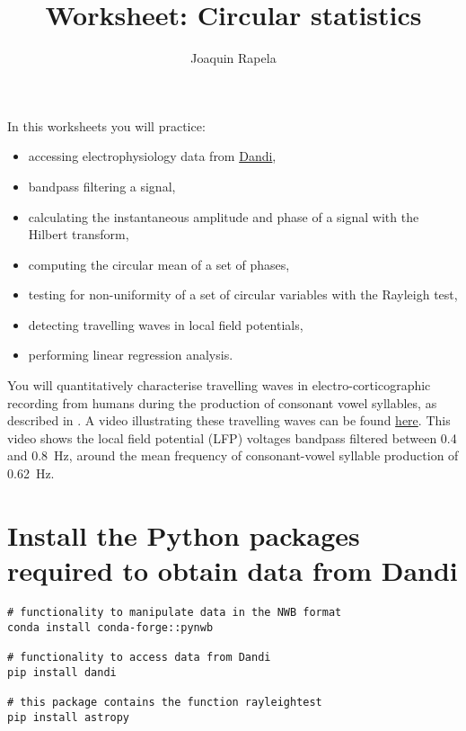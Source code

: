 \documentclass[12pt]{article}
\title{Worksheet: Circular statistics}
\author{Joaquin Rapela}
\begin{document}
\maketitle

In this worksheets you will practice:

\begin{itemize}

    \item accessing electrophysiology data from
        \href{https://dandiarchive.org/}{Dandi},

    \item bandpass filtering a signal,

    \item calculating the instantaneous amplitude and phase of a signal with
        the Hilbert transform,

    \item computing the circular mean of a set of phases,

    \item testing for non-uniformity of a set of circular variables with the
        Rayleigh test,

    \item detecting travelling waves in local field potentials,

    \item performing linear regression analysis.

\end{itemize}

You will quantitatively characterise travelling waves in electro-corticographic
recording from humans during the production of consonant vowel syllables, as
described in
\citet{rapelaInPrepTWsInSpeech,rapelaInPrepSyncTWs,rapelaInPrepSyncTWsII}. A
video illustrating these travelling waves can be found
\href{https://www.youtube.com/watch?v=6QYUGRqZ7Hc}{here}. This video shows the
local field potential (LFP) voltages bandpass filtered between 0.4 and 0.8~Hz,
around the mean frequency of consonant-vowel syllable production of 0.62~Hz.

\section{Install the Python packages required to obtain data from Dandi}

\begin{verbatim}
# functionality to manipulate data in the NWB format
conda install conda-forge::pynwb

# functionality to access data from Dandi
pip install dandi

# this package contains the function rayleightest
pip install astropy

\end{verbatim}
\end{document}
